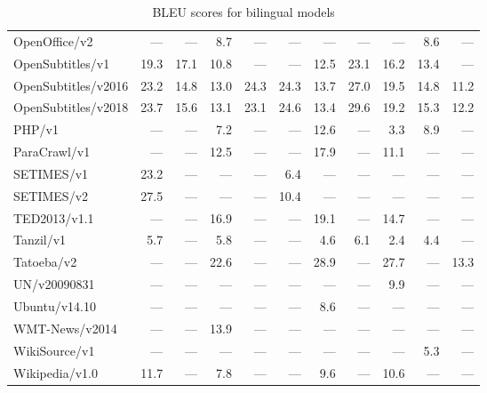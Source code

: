 \begin{table}[h]
\begin{tabular}{lrrrrrrrrrr}
OpenOffice/v2        &  --- &  --- &  8.7 &  --- &  --- &  --- &  --- &  --- &  8.6 &  --- \\
OpenSubtitles/v1     & 19.3 & 17.1 & 10.8 &  --- &  --- & 12.5 & 23.1 & 16.2 & 13.4 &  --- \\
OpenSubtitles/v2016  & 23.2 & 14.8 & 13.0 & 24.3 & 24.3 & 13.7 & 27.0 & 19.5 & 14.8 & 11.2 \\
OpenSubtitles/v2018  & 23.7 & 15.6 & 13.1 & 23.1 & 24.6 & 13.4 & 29.6 & 19.2 & 15.3 & 12.2 \\
PHP/v1               &  --- &  --- &  7.2 &  --- &  --- & 12.6 &  --- &  3.3 &  8.9 &  --- \\
ParaCrawl/v1         &  --- &  --- & 12.5 &  --- &  --- & 17.9 &  --- & 11.1 &  --- &  --- \\
SETIMES/v1           & 23.2 &  --- &  --- &  --- &  6.4 &  --- &  --- &  --- &  --- &  --- \\
SETIMES/v2           & 27.5 &  --- &  --- &  --- & 10.4 &  --- &  --- &  --- &  --- &  --- \\
TED2013/v1.1         &  --- &  --- & 16.9 &  --- &  --- & 19.1 &  --- & 14.7 &  --- &  --- \\
Tanzil/v1            &  5.7 &  --- &  5.8 &  --- &  --- &  4.6 &  6.1 &  2.4 &  4.4 &  --- \\
Tatoeba/v2           &  --- &  --- & 22.6 &  --- &  --- & 28.9 &  --- & 27.7 &  --- & 13.3 \\
UN/v20090831         &  --- &  --- &  --- &  --- &  --- &  --- &  --- &  9.9 &  --- &  --- \\
Ubuntu/v14.10        &  --- &  --- &  --- &  --- &  --- &  8.6 &  --- &  --- &  --- &  --- \\
WMT-News/v2014       &  --- &  --- & 13.9 &  --- &  --- &  --- &  --- &  --- &  --- &  --- \\
WikiSource/v1        &  --- &  --- &  --- &  --- &  --- &  --- &  --- &  --- &  5.3 &  --- \\
Wikipedia/v1.0       & 11.7 &  --- &  7.8 &  --- &  --- &  9.6 &  --- & 10.6 &  --- &  --- \\
\bottomrule
\end{tabular}

\caption{BLEU scores for bilingual models}
\label{table:bilingual-results}
\end{table}

